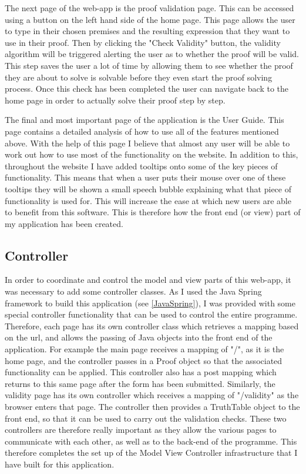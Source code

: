 The next page of the web-app is the proof validation page. This can be accessed using a button on the left hand side of the home page. This page allows the user to type in their chosen premises and the resulting expression that they want to use in their proof. Then by clicking the "Check Validity" button, the validity algorithm will be triggered alerting the user as to whether the proof will be valid. This step saves the user a lot of time by allowing them to see whether the proof they are about to solve is solvable before they even start the proof solving process. Once this check has been completed the user can navigate back to the home page in order to actually solve their proof step by step.

The final and most important page of the application is the User Guide. This page contains a detailed analysis of how to use all of the features mentioned above. With the help of this page I believe that almost any user will be able to work out how to use most of the functionality on the website. In addition to this, throughout the website I have added tooltips onto some of the key pieces of functionality. This means that when a user puts their mouse over one of these tooltips they will be shown a small speech bubble explaining what that piece of functionality is used for. This will increase the ease at which new users are able to benefit from this software. This is therefore how the front end (or view) part of my application has been created.

\subsection{Controller}

In order to coordinate and control the model and view parts of this web-app, it was necessary to add some controller classes. As I used the Java Spring framework to build this application (see \ref{JavaSpring}), I was provided with some special controller functionality that can be used to control the entire programme. Therefore, each page has its own controller class which retrieves a mapping based on the url, and allows the passing of Java objects into the front end of the application. For example the main page receives a mapping of "/", as it is the home page, and the controller passes in a Proof object so that the associated functionality can be applied. This controller also has a post mapping which returns to this same page after the form has been submitted. Similarly, the validity page has its own controller which receives a mapping of "/validity" as the browser enters that page. The controller then provides a TruthTable object to the front end, so that it can be used to carry out the validation checks. These two controllers are therefore really important as they allow the various pages to communicate with each other, as well as to the back-end of the programme. This therefore completes the set up of the Model View Controller infrastructure that I have built for this application.

